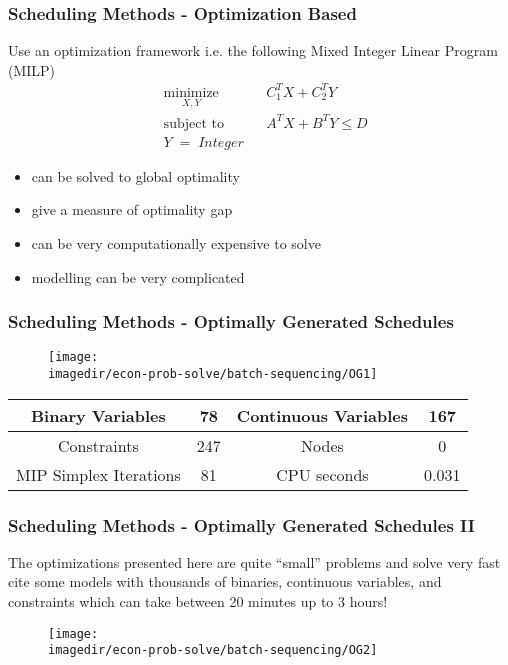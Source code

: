 \begin{frame}\frametitle{Scheduling Methods - Optimization Based} Use an optimization framework i.e. the following Mixed Integer Linear Program (MILP)
	\begin{equation*}
		\begin{aligned}
			& \underset{X,Y}{\text{minimize}} & & C_{1}^{T}X + C_{2}^{T}Y \\
			& \text{subject to} & & A^{T}X + B^{T}Y \leq D\\
			& Y \; = \; Integer 
		\end{aligned}
	\end{equation*}
	\begin{itemize}
		\item	can be solved to global optimality 
		\item	give a measure of optimality gap 
		\item	can be very computationally expensive to solve 
		\item	modelling can be very complicated 
	\end{itemize}
\end{frame}

\begin{frame}\frametitle{Scheduling Methods - Optimally Generated Schedules}
	\begin{figure}
		[!htb] 
		\begin{center}
			\texttt{[image: \\imagedir/econ-prob-solve/batch-sequencing/OG1]} \label{fig:Og1} 
		\end{center}
	\end{figure}
	\begin{center}
		\begin{tabular}
			{ c |c|c| c } \hline Binary Variables & 78 & Continuous Variables & 167\\
			\hline Constraints & 247 & Nodes & 0\\
			\hline MIP Simplex Iterations & 81 & CPU seconds & 0.031\\
			\hline 
		\end{tabular}
	\end{center}
\end{frame}

\begin{frame}\frametitle{Scheduling Methods - Optimally Generated Schedules II}
	
	The optimizations presented here are quite ``small'' problems and solve very fast\\
	
	\cite{FnL04} cite some models with thousands of binaries, continuous variables, and constraints which can take between 20 minutes up to 3 hours!
	\begin{figure}
		[!htb] 
		\begin{center}
			\texttt{[image: \\imagedir/econ-prob-solve/batch-sequencing/OG2]}  \label{fig:Og2} 
		\end{center}
	\end{figure}
\end{frame}


